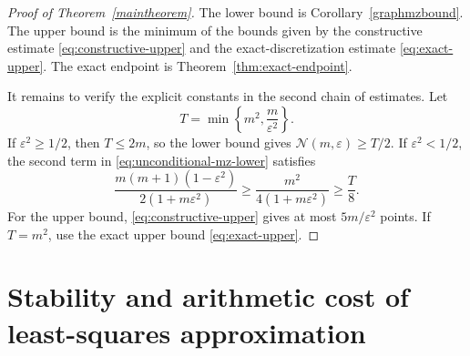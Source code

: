 \documentclass[a4paper]{amsart}
\numberwithin{equation}{section}
\begin{document}
\begin{proof}[Proof of Theorem~\ref{maintheorem}]
    The lower bound is Corollary~\ref{graphmzbound}.
    The upper bound is the minimum of the bounds given by the constructive estimate \eqref{eq:constructive-upper} and the exact-discretization estimate \eqref{eq:exact-upper}.
    The exact endpoint is Theorem~\ref{thm:exact-endpoint}.

    It remains to verify the explicit constants in the second chain of estimates.
    Let
    \begin{equation*}
        T=\min\left\{m^2,\frac{m}{\varepsilon^2}\right\}.
    \end{equation*}
    If $\varepsilon^2\geq1/2$, then $T\leq2m$, so the lower bound gives $\mathcal N(m,\varepsilon)\geq T/2$.
    If $\varepsilon^2<1/2$, the second term in \eqref{eq:unconditional-mz-lower} satisfies
    \begin{equation*}
        \frac{m(m+1)(1-\varepsilon^2)}{2(1+m\varepsilon^2)}
        \geq\frac{m^2}{4(1+m\varepsilon^2)}
        \geq\frac T8.
    \end{equation*}
    For the upper bound, \eqref{eq:constructive-upper} gives at most $5m/\varepsilon^2$ points.
    If $T=m^2$, use the exact upper bound \eqref{eq:exact-upper}.
\end{proof}
 \section{Stability and arithmetic cost of least-squares approximation}\label{sec:lsqr}
\end{document}
